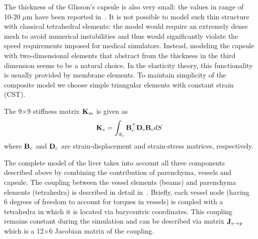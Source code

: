 
The thickness of the Glisson's capsule is also very small: the values in range of 10-20 $\mu$m have been reported in~\cite{Umale2011}.
It is not possible to model such thin structure with classical tetrahedral
elements:
the model would require an extremely 
dense mesh to avoid numerical instabilities and thus would significantly
violate the speed requirements imposed for medical simulators.
Instead, modeling the capsule with two-dimensional elements that abstract from the
thickness in the third dimension seems
to be a natural choice. In the elasticity theory, this functionality is usually provided by membrane elements.
To maintain simplicity of the composite model we choose simple triangular
elements with constant strain (CST).

The 9$\times$9 stiffness matrix $\mathbf{K}_m$ is given as 
%
\begin{equation}
 \mathbf{K}_c = \int_{S_c} \mathbf{B}_c^\top \mathbf{D}_c \mathbf{B}_c dS 
\end{equation}
where $\mathbf{B}_c$ and $\mathbf{D}_c$ are strain-displacement and strain-stress matrices, respectively. 


The complete model of the liver takes into account all three components described above by combining the contribution 
of parenchyma, vessels and capsule. The coupling between the vessel elements (beams) and parenchyma elements (tetrahedra)
is described in detail in~\cite{Peterlik2012}. Briefly, each vessel node (having 6 degrees of freedom to account for torques in vessels) 
is coupled with a tetrahedra in which it is located via barycentric coordinates. This coupling remains constant during 
the simulation and can be described via matrix $\mathbf{J}_{v\rightarrow p}$ which is a 12$\times$6 Jacobian matrix of the coupling.

